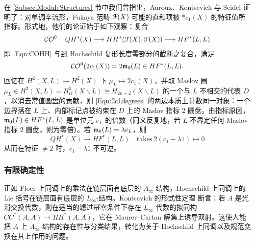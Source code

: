 \begin{Remark}\label{Rem:StarC1}
在 \ref{Subsec:ModuleStructures} 节中我们曾指出，Auroux、Kontsevich 与 Seidel 证明了：对单调辛流形，Fukaya 范畴 $\scrF(X)$ 可能的直和项被 $\ast c_1(X)$ 的特征值所指标。形式地，他们的论证始于如下观察：复合
\[
\mathcal{CO}^0: \ QH^*(X) \longrightarrow HH^*(\scrF(X), \scrF(X)) \longrightarrow HF^*(L,L)
\]
即 \eqref{Eqn:COHH} 与到 Hochschild 复形长度零部分的截断之复合，满足
\begin{equation} \label{Eqn:2c1degrees}
\mathcal{CO}^0(2c_1(X)) = 2 \frak{m}_0(L) \in HF^*(L,L).
\end{equation}
回忆在 $H^2(X,L) \rightarrow H^2(X)$ 下 $\mu_L \mapsto 2c_1(X)$，并取 Maslov 圈 $\mu_L \in H^2(X,L) = H^2_{ct}(X\backslash L)  \cong H_{2n-2}(X\backslash L)$ 的一个与 $L$ 不相交的代表 $D$，以消去常值圆盘的贡献，则 \eqref{Eqn:2c1degrees} 的两边本质上计数同一对象：一个边界落在 $L$ 上、内部标记点被约束在 $D$ 上的 Maslov 指标 2 圆盘。由指标原因，$\frak{m}_0(L) \in HF^*(L,L)$ 是单位元 $e_L$ 的倍数（同义反复地，若 $L$ 不界定任何 Maslov 指标 2 圆盘，则为零倍）。若 $\frak{m}_0(L) = \lambda e_L$，则
\[
QH^*(X) \rightarrow HF^*(L,L) \quad \mathrm{takes} \ 2(c_1-\lambda 1) \mapsto 0
\]
从而在特征 $\neq 2$ 时，$c_1-\lambda 1$ 不可逆。
\end{Remark}

\subsubsection{有限确定性\label{Subsec:FiniteDeterminacy}}

正如 Floer 上同调上的乘法在链层面有底层的 $A_{\infty}$-结构，Hochschild 上同调上的 Lie 括号在链层面有底层的 $L_{\infty}$-结构。Kontsevich 的形式性定理 \cite{Kontsevich:DefQuant} 断言：若 $A$ 是光滑交换代数，则在适当的滤过幂零条件下存在 $L_{\infty}$-代数的拟同构 $CC^*(A,A) \rightarrow HH^*(A,A)$，它在 Maurer--Cartan 解集上诱导双射。这使人能把 $A$ 上 $A_{\infty}$-结构的存在性与分类结果，转化为关于 Hochschild 上同调以及规范变换在其上作用的问题。

